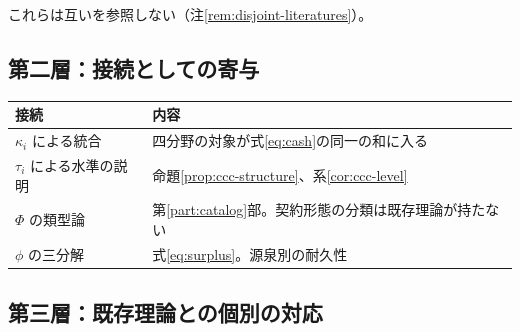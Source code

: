 これらは互いを参照しない（注\ref{rem:disjoint-literatures}）。

\subsection*{第二層：接続としての寄与}

\begin{center}
\begin{tabularx}{\textwidth}{@{}lX@{}}
\toprule
接続 & 内容 \\
\midrule
$\kappa_i$ による統合 & 四分野の対象が式\eqref{eq:cash}の同一の和に入る \\
$\tau_i$ による水準の説明 & 命題\ref{prop:ccc-structure}、系\ref{cor:ccc-level} \\
$\Phi$ の類型論 & 第\ref{part:catalog}部。契約形態の分類は既存理論が持たない \\
$\phi$ の三分解 & 式\eqref{eq:surplus}。源泉別の耐久性 \\
\bottomrule
\end{tabularx}
\label{tab:priorwork-layer2}
\end{center}

\subsection*{第三層：既存理論との個別の対応}

